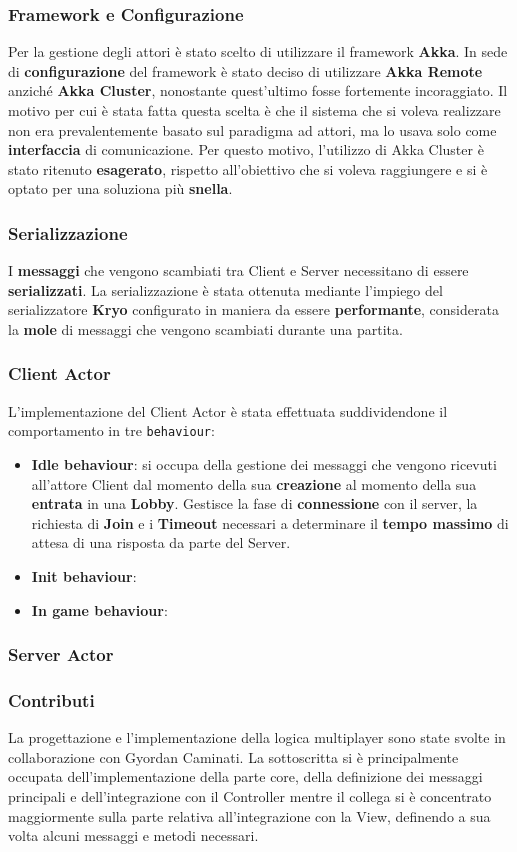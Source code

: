 \subsubsection{Framework e Configurazione}
Per la gestione degli attori è stato scelto di utilizzare il framework \textbf{Akka}. In sede di \textbf{configurazione} del framework è stato deciso di utilizzare \textbf{Akka Remote} anziché \textbf{Akka Cluster}, nonostante quest'ultimo fosse fortemente incoraggiato. Il motivo per cui è stata fatta questa scelta è che il sistema che si voleva realizzare non era prevalentemente basato sul paradigma ad attori, ma lo usava solo come \textbf{interfaccia} di comunicazione. Per questo motivo, l'utilizzo di Akka Cluster è stato ritenuto \textbf{esagerato}, rispetto all'obiettivo che si voleva raggiungere e si è optato per una soluziona più \textbf{snella}.

\subsubsection{Serializzazione}
I \textbf{messaggi} che vengono scambiati tra Client e Server necessitano di essere \textbf{serializzati}. La serializzazione è stata ottenuta mediante l'impiego del serializzatore \textbf{Kryo} configurato in maniera da essere \textbf{performante}, considerata la \textbf{mole} di messaggi che vengono scambiati durante una partita.  

\subsubsection{Client Actor}
L'implementazione del Client Actor è stata effettuata suddividendone il comportamento in tre \texttt{behaviour}:
\begin{itemize}
    \item \textbf{Idle behaviour}: si occupa della gestione dei messaggi che vengono ricevuti all'attore Client dal momento della sua \textbf{creazione} al momento della sua \textbf{entrata} in una \textbf{Lobby}. Gestisce la fase di \textbf{connessione} con il server, la richiesta di \textbf{Join} e i \textbf{Timeout} necessari a determinare il \textbf{tempo massimo} di attesa di una risposta da parte del Server.
    \item \textbf{Init behaviour}:
    \item \textbf{In game behaviour}:
\end{itemize}
\subsubsection{Server Actor}

\subsubsection{Contributi}
La progettazione e l'implementazione della logica multiplayer sono state svolte in collaborazione con Gyordan Caminati. La sottoscritta si è principalmente occupata dell'implementazione della parte core, della definizione dei messaggi principali e dell'integrazione con il Controller mentre il collega si è concentrato maggiormente sulla parte relativa all'integrazione con la View, definendo a sua volta alcuni messaggi e metodi necessari.

